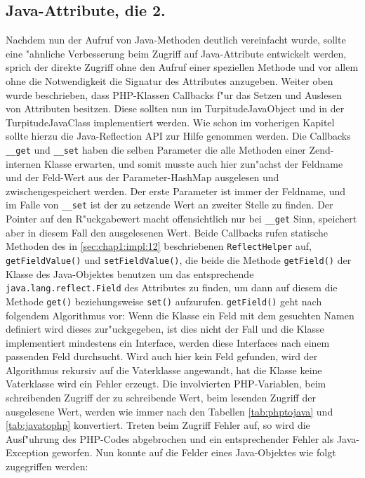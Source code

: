 \subsection{Java-Attribute, die 2.}
\label{sec:chap1:impl:14}

Nachdem nun der Aufruf von Java-Methoden deutlich vereinfacht wurde, sollte eine "ahnliche Verbesserung beim Zugriff auf Java-Attribute
entwickelt werden, sprich der direkte Zugriff ohne den Aufruf einer speziellen Methode und vor allem ohne die Notwendigkeit die
Signatur des Attributes anzugeben. Weiter oben wurde beschrieben, dass PHP-Klassen Callbacks f"ur das Setzen und Auslesen von 
Attributen besitzen. Diese sollten nun im TurpitudeJavaObject und in der TurpitudeJavaClass implementiert werden. Wie schon
im vorherigen Kapitel sollte hierzu die Java-Reflection API zur Hilfe genommen werden. Die Callbacks \texttt{\_\_get} und \texttt{\_\_set}
haben die selben Parameter die alle Methoden einer Zend-internen Klasse erwarten, und somit musste auch hier zun"achst der Feldname
und der Feld-Wert aus der Parameter-HashMap ausgelesen und zwischengespeichert werden. Der erste Parameter ist immer der Feldname,
und im Falle von \texttt{\_\_set} ist der zu setzende Wert an zweiter Stelle zu finden. Der Pointer auf den R"uckgabewert macht 
offensichtlich nur bei \texttt{\_\_get} Sinn, speichert aber in diesem Fall den ausgelesenen Wert. Beide Callbacks rufen statische Methoden
des in \ref{sec:chap1:impl:12} beschriebenen \texttt{ReflectHelper} auf, \texttt{getFieldValue()} und \texttt{setFieldValue()}, die beide
die Methode \texttt{getField()} der Klasse des Java-Objektes benutzen um das entsprechende \texttt{java.lang.reflect.Field} des Attributes 
zu finden, um dann auf diesem die Methode \texttt{get()} beziehungsweise \texttt{set()} aufzurufen. \texttt{getField()} geht nach folgendem
Algorithmus vor: Wenn die Klasse ein Feld mit dem gesuchten Namen definiert wird dieses zur"uckgegeben, ist dies nicht der Fall und die
Klasse implementiert mindestens ein Interface, werden diese Interfaces nach einem passenden Feld durchsucht. Wird auch hier kein Feld
gefunden, wird der Algorithmus rekursiv auf die Vaterklasse angewandt, hat die Klasse keine Vaterklasse wird ein Fehler erzeugt.
Die involvierten PHP-Variablen, beim
schreibenden Zugriff der zu schreibende Wert, beim lesenden Zugriff der ausgelesene Wert, werden wie immer nach den Tabellen
\ref{tab:phptojava} und \ref{tab:javatophp} konvertiert. Treten beim Zugriff Fehler auf, so wird die Ausf"uhrung des PHP-Codes abgebrochen
und ein entsprechender Fehler als Java-Exception geworfen. Nun konnte auf die Felder eines Java-Objektes wie folgt zugegriffen werden:

